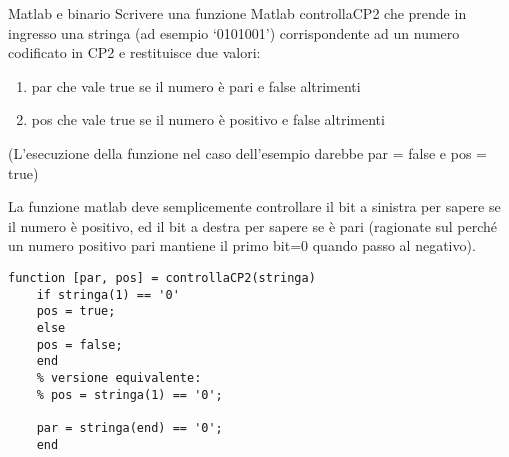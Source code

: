 \iffalse
\begin{frame}[fragile]{Matlab e binario}
    \framebreak
    Scrivere  una  funzione  Matlab  controllaCP2  che  prende  in  ingresso  una  stringa  (ad
    esempio ‘0101001’)  corrispondente  ad  un  numero  codificato  in  CP2  e  restituisce  due
    valori:
    \begin{enumerate}
        \item par  che  vale  true  se  il  numero  è  pari  e  false  altrimenti
        \item    pos  che  vale  true  se  il  numero  è  positivo  e  false  altrimenti
    \end{enumerate}
    (L’esecuzione  della  funzione  nel  caso  dell’esempio  darebbe  par = false  e  pos =
    true)


    \framebreak

    La funzione matlab deve semplicemente controllare il bit a sinistra per sapere se il numero è positivo, ed il bit a destra per sapere se è pari (ragionate sul perché un numero positivo pari mantiene il primo bit=0 quando passo al negativo).
    \begin{lstlisting}[style=matlab]
    function [par, pos] = controllaCP2(stringa)
    if stringa(1) == '0'
    pos = true;
    else
    pos = false;
    end
    % versione equivalente:
    % pos = stringa(1) == '0';

    par = stringa(end) == '0';
    end
    \end{lstlisting}


\end{frame}



